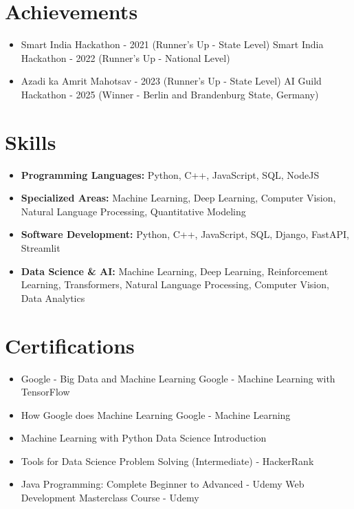 \documentclass[a4paper,10pt]{article}
\begin{document}
\section*{Achievements}
\begin{itemize}
\item Smart India Hackathon - 2021 (Runner's Up - State Level) \hfill Smart India Hackathon - 2022 (Runner's Up - National Level)
\item Azadi ka Amrit Mahotsav - 2023 (Runner's Up - State Level) \hfill AI Guild Hackathon - 2025 (Winner - Berlin and Brandenburg State, Germany)
\end{itemize}

\section*{Skills}
\begin{itemize}
  \item \textbf{Programming Languages:} Python, C++, JavaScript, SQL, NodeJS
  \item \textbf{Specialized Areas:} Machine Learning, Deep Learning, Computer Vision, Natural Language Processing, Quantitative Modeling
  \item \textbf{Software Development:} Python, C++, JavaScript, SQL, Django, FastAPI, Streamlit
  \item \textbf{Data Science \& AI:} Machine Learning, Deep Learning, Reinforcement Learning, Transformers, Natural Language Processing, Computer Vision, Data Analytics
\end{itemize}

\section*{Certifications}
\begin{itemize}
\item Google - Big Data and Machine Learning \hfill Google - Machine Learning with TensorFlow
\item How Google does Machine Learning \hfill Google - Machine Learning
\item Machine Learning with Python \hfill Data Science Introduction
\item Tools for Data Science \hfill Problem Solving (Intermediate) - HackerRank
\item Java Programming: Complete Beginner to Advanced - Udemy \hfill Web Development Masterclass Course - Udemy
\end{itemize}
\end{document}
